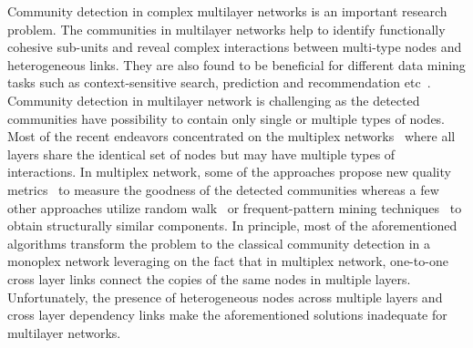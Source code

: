 Community detection in complex multilayer networks is an important research problem.
The communities in multilayer networks help to identify
functionally cohesive sub-units and reveal complex interactions between multi-type nodes
and heterogeneous links. They are also found to be beneficial for different
data mining tasks such as context-sensitive search, prediction and recommendation etc~\cite{metafac}. %
Community detection in multilayer network is challenging as the detected communities have possibility to contain only single or
multiple types of nodes.
Most of the recent endeavors concentrated on the
multiplex networks~\cite{mucha2010community,kuncheva2015community} where all layers share the
identical set of nodes but may have multiple types of interactions. In multiplex network, some of the approaches propose new quality
metrics~\cite{mucha2010community} to measure the goodness of the detected communities
whereas a few other
approaches utilize random walk~\cite{kuncheva2015community}
or frequent-pattern mining techniques~\cite{berlingerio2013abacus}
to obtain structurally similar components.
In principle, most of the aforementioned algorithms transform the problem to the classical community detection in a monoplex network
leveraging on the fact that in multiplex network, one-to-one cross layer links connect the copies of the same nodes in multiple
layers. Unfortunately, the presence of heterogeneous nodes across multiple layers and cross layer dependency links make the
aforementioned solutions
inadequate for multilayer networks.




